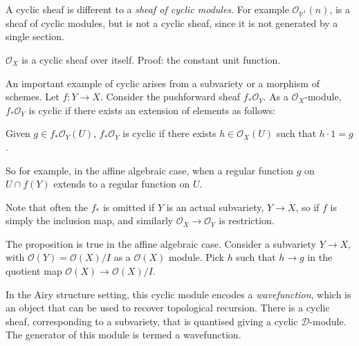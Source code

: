     \begin{rem} A cyclic sheaf is different to a \emph{sheaf of cyclic modules}. For example
    \( \mathcal{O}_{\mathbb{P}^1}(n)\), is a sheaf of cyclic modules, but is not a cyclic sheaf, since it is not generated by a single section. %
    \end{rem} 
        
    \begin{ex}
    \( \mathcal{O}_X\) is a cyclic sheaf over itself.
    Proof: the constant unit function.
    \end{ex}

    An important example of cyclic arises from a subvariety or a morphism of schemes. Let \(f : Y \rightarrow X\). Consider the pushforward sheaf \( f_{*} \mathcal{O}_Y\). As a \( \mathcal{O}_X\)-module, \( f_{*} \mathcal{O}_Y\) is cyclic if there exists an extension of elements as follows:

    \begin{prop}
    Given \(g \in f_{*} \mathcal{O}_Y(U) \), 
    \(f_{*} \mathcal{O}_Y\) is cyclic if there exists \(h \in \mathcal{O}_X(U)\) such that \(h \cdot 1 = g\).
    \end{prop}
    So for example, in the affine algebraic case, when a regular function \(g\) on \(U \cap f(Y)\) extends to a regular function on \(U\).
    
    \begin{note} Note that often the \(f_{*}\) is omitted if \(Y\) is an actual subvariety, \(Y \rightarrow X\), so if \(f\) is simply the inclusion map, and similarly \( \mathcal{O}_X \rightarrow \mathcal{O}_Y\) is restriction.
    \end{note}
    
    The proposition is true in the affine algebraic case. Consider a subvariety \( Y \rightarrow X\), with  \(\mathcal{O}(Y) = \mathcal{O}(X)/I\) as a \( \mathcal{O}(X)\) module. Pick \(h\) such that \(h \rightarrow g\) in the quotient map \( \mathcal{O}(X) \rightarrow \mathcal{O}(X)/I\).
    

    In the Airy structure setting, this cyclic module encodes a \emph{wavefunction}, which is an object that can be used to recover topological recursion. There is a cyclic sheaf, corresponding to a subvariety, that is quantised giving a cyclic \( \mathcal{D}\)-module. The generator of this module is termed a wavefunction.
    
